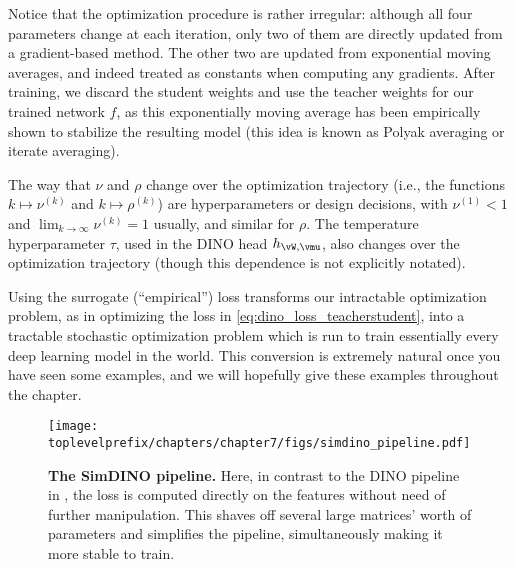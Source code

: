 \documentclass[../../book-main.tex]{subfiles}
\begin{document}
Notice that the optimization procedure is rather irregular: although all four parameters change at each iteration, only two of them are directly updated from a gradient-based method. The other two are updated from exponential moving averages, and indeed treated as constants when computing any gradients. After training, we discard the student weights and use the teacher weights for our trained network \(f\), as this exponentially moving average has been empirically shown to stabilize the resulting model (this idea is known as Polyak averaging or iterate averaging). 

The way that \(\nu\) and \(\rho\) change over the optimization trajectory (i.e., the functions \(k \mapsto \nu^{(k)}\) and \(k \mapsto \rho^{(k)}\)) are hyperparameters or design decisions, with \(\nu^{(1)} < 1\) and \(\lim_{k \to \infty}\nu^{(k)} = 1\) usually, and similar for \(\rho\). The temperature hyperparameter \(\tau\), used in the DINO head \(h_{\vW, \vmu}\), also changes over the optimization trajectory (though this dependence is not explicitly notated).

Using the surrogate (``empirical'') loss transforms our intractable optimization problem, as in optimizing the loss in \eqref{eq:dino_loss_teacherstudent}, into a tractable stochastic optimization problem which is run to train essentially every deep learning model in the world. This conversion is extremely natural once you have seen some examples, and we will hopefully give these examples throughout the chapter. 

\begin{figure}
    \centering 
    \texttt{[image: \\toplevelprefix/chapters/chapter7/figs/simdino\_pipeline.pdf]}
    \caption{\small\textbf{The SimDINO pipeline.} Here, in contrast to the DINO pipeline in , the loss is computed directly on the features without need of further manipulation. This shaves off several large matrices' worth of parameters and simplifies the pipeline, simultaneously making it more stable to train.}\label{fig:simdino_pipeline}
\end{figure}
\end{document}
